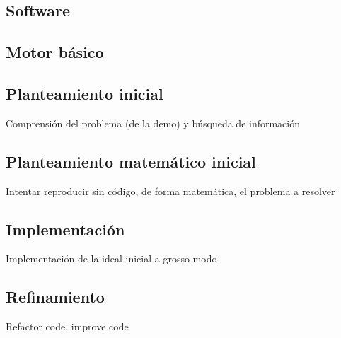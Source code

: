 \subsection{Software}

\subsection{Motor básico}

\subsection{Planteamiento inicial}
Comprensión del problema (de la demo) y búsqueda de información

\subsection{Planteamiento matemático inicial}
Intentar reproducir sin código, de forma matemática, el problema a resolver

\subsection{Implementación}
Implementación de la ideal inicial a grosso modo

\subsection{Refinamiento}
Refactor code, improve code
